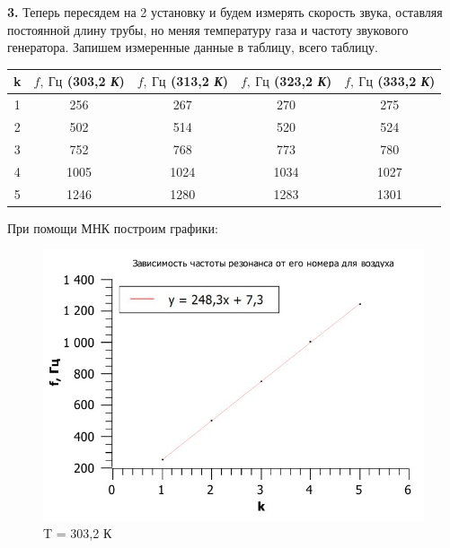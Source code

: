 \documentclass[12pt,a4paper]{article}
\begin{document}
\textbf{3.} Теперь пересядем на 2 установку и будем измерять скорость звука, оставляя постоянной длину трубы, но меняя температуру газа и частоту звукового генератора. Запишем измеренные данные в таблицу, всего таблицу.

\begin{tabular}{|c|c|c|c|c|}
\hline 
k & $f, \: \textit{Гц}$ (303,2 \textit{К}) & $f, \: \textit{Гц}$ (313,2 \textit{К}) & $f, \: \textit{Гц}$ (323,2 \textit{К}) & $f, \: \textit{Гц}$ (333,2 \textit{К}) \\ 
\hline 
1 & 256 & 267 & 270 & 275 \\ 
\hline 
2 & 502 & 514 & 520 & 524 \\ 
\hline 
3 & 752 & 768 & 773 & 780 \\ 
\hline 
4 & 1005 & 1024 & 1034 & 1027 \\ 
\hline 
5 & 1246 & 1280 & 1283 & 1301 \\ 
\hline 
\end{tabular} 

\vspace{0.5cm}

При помощи МНК построим графики:

\begin{figure}[h!]
\centering
\includegraphics[scale=0.4]{V_6-1.jpg}
\caption{T = 303,2 К}
\label{fig:Experimental setup}
\end{figure}
\end{document}
